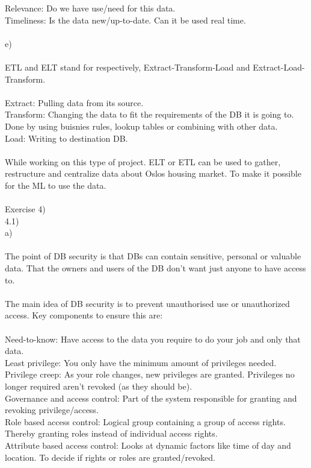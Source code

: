 \documentclass[12pt, letterpaper, twoside]{article}
\begin{document}
Relevance: Do we have use/need for this data.\\
Timeliness: Is the data new/up-to-date. Can it be used real time.\\
\newpage
\ \\
e)\\
\ \\
ETL and ELT stand for respectively, Extract-Transform-Load and Extract-Load-Transform.\\
\ \\
Extract: Pulling data from its source.\\
Transform: Changing the data to fit the requirements of the DB it is going to. Done by using buisnies rules, lookup tables or combining with other data.\\
Load: Writing to destination DB.\\
\ \\
While working on this type of project. ELT or ETL can be used to gather, restructure and centralize data about Oslos housing market. To make it possible for the ML to use the data.\\
\ \\
Exercise 4)\\
4.1)\\
a)\\
\ \\ 
The point of DB security is that DBs can contain sensitive, personal or valuable data. That the owners and users of the DB don't want just anyone to have access to.\\
\ \\
The main idea of DB security is to prevent unauthorised use or unauthorized access. Key components to ensure this are:\\
\ \\ 
Need-to-know: Have access to the data you require to do your job and only that data.\\
Least privilege: You only have the minimum amount of privileges needed.\\
Privilege creep: As your role changes, new privileges are granted. Privileges no longer required aren't revoked (as they should be).\\
Governance and access control: Part of the system responsible for granting and revoking privilege/access.\\
Role based access control: Logical group containing a group of access rights. Thereby granting roles instead of individual access rights.\\
Attribute based access control: Looks at dynamic factors like time of day and location. To decide if rights or roles are granted/revoked.\\
\end{document}
